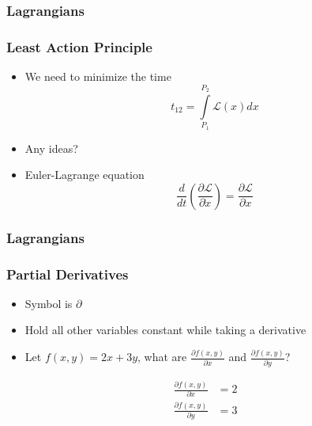 \documentclass[12pt]{beamer}
\begin{document}
\begin{frame}
\frametitle{Lagrangians}
\frametitle{Least Action Principle}
\begin{itemize}
    \item We need to minimize the time 
    $$
    t_{12} = \int \limits_{P_1}^{P_2} \mathcal{L}(x) dx
    $$
    \pause
    \item Any ideas?
    \pause
    \item Euler-Lagrange equation
    $$
    \frac{d}{dt} \left (\frac{\partial \mathcal{L}}{\partial \dot{x}} \right) = \frac{\partial \mathcal{L}}{\partial x}
    $$
\end{itemize}
\end{frame}

\begin{frame}
\frametitle{Lagrangians}
\frametitle{Partial Derivatives}

\begin{itemize}
    \item Symbol is $\partial$
    \pause
    \item Hold all other variables constant while taking a derivative
    \pause
    \item Let $f(x,y) = 2x+3y$, what are $\frac{\partial f(x,y)}{\partial x}$ and $\frac{\partial f(x,y)}{\partial y}$?
    \pause
\end{itemize}
\begin{align*}
\frac{\partial f(x,y)}{\partial x} &= 2 \\
\frac{\partial f(x,y)}{\partial y} &= 3 \\
\end{align*}

\end{frame}
\end{document}
